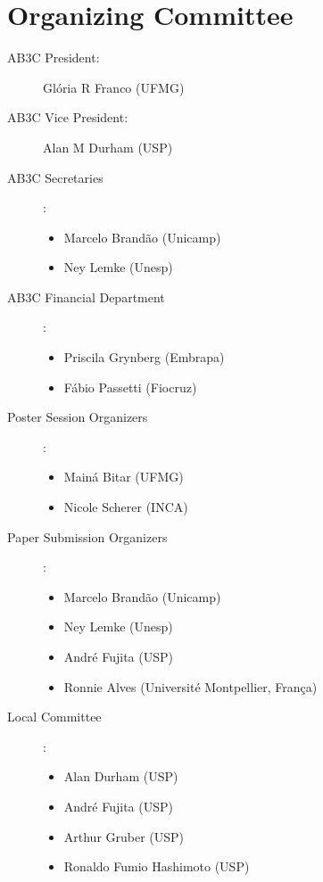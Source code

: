 
\chapter{Organizing Committee}

\begin{description}

\item[AB3C President:] Glória R Franco (UFMG)

\item[AB3C Vice President:] Alan M Durham (USP)


\item[AB3C Secretaries]:

\begin{itemize}
 \item Marcelo Brandão (Unicamp) 
\item  Ney Lemke (Unesp)
\end{itemize}

\item[AB3C Financial Department]:

\begin{itemize}
\item Priscila Grynberg (Embrapa)
\item Fábio Passetti (Fiocruz)
\end{itemize}

\item[Poster Session Organizers]:

\begin{itemize}
\item Mainá Bitar (UFMG)
\item Nicole Scherer (INCA)
\end{itemize}

\item[Paper Submission Organizers]:  

\begin{itemize}
\item Marcelo Brandão (Unicamp)
\item Ney Lemke (Unesp)
\item André Fujita (USP)
\item Ronnie Alves (Université Montpellier, França)
\end{itemize}

\item[Local Committee]:

\begin{itemize}
\item Alan Durham (USP)
\item André Fujita (USP)
\item Arthur Gruber (USP)
\item  Ronaldo Fumio Hashimoto (USP)
\end{itemize}
\end{description}
\newpage
